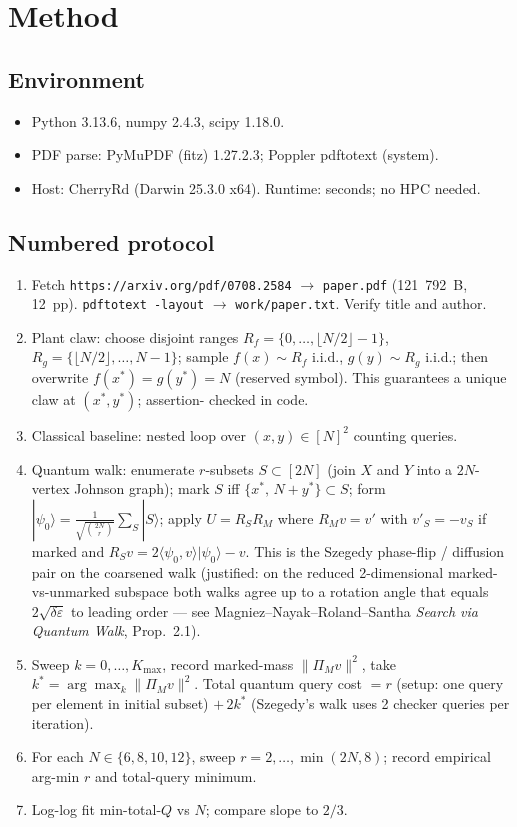 \documentclass[11pt]{article}
\begin{document}
\section{Method}
\subsection{Environment}
\begin{itemize}
\item Python 3.13.6, numpy 2.4.3, scipy 1.18.0.
\item PDF parse: PyMuPDF (fitz) 1.27.2.3; Poppler pdftotext (system).
\item Host: CherryRd (Darwin 25.3.0 x64). Runtime: seconds; no HPC needed.
\end{itemize}

\subsection{Numbered protocol}
\begin{enumerate}
\item Fetch \texttt{https://arxiv.org/pdf/0708.2584} $\rightarrow$
      \texttt{paper.pdf} (121~792~B, 12~pp). \texttt{pdftotext -layout}
      $\rightarrow$ \texttt{work/paper.txt}. Verify title and author.
\item Plant claw: choose disjoint ranges $R_f=\{0,\ldots,\lfloor N/2\rfloor-1\}$,
      $R_g=\{\lfloor N/2\rfloor,\ldots,N-1\}$; sample $f(x)\sim R_f$ i.i.d.,
      $g(y)\sim R_g$ i.i.d.; then overwrite $f(x^\ast)=g(y^\ast)=N$ (reserved
      symbol). This guarantees a unique claw at $(x^\ast,y^\ast)$; assertion-
      checked in code.
\item Classical baseline: nested loop over $(x,y)\in[N]^2$ counting queries.
\item Quantum walk: enumerate $r$-subsets $S\subset[2N]$ (join $X$ and $Y$ into
      a $2N$-vertex Johnson graph); mark $S$ iff $\{x^\ast,\,N+y^\ast\}\subset S$;
      form $|\psi_0\rangle=\frac{1}{\sqrt{\binom{2N}{r}}}\sum_S|S\rangle$;
      apply $U=R_S R_M$ where $R_M v = v'$ with $v'_S=-v_S$ if marked
      and $R_S v = 2\langle\psi_0,v\rangle|\psi_0\rangle - v$. This is the
      Szegedy phase-flip / diffusion pair on the coarsened walk (justified: on
      the reduced 2-dimensional marked-vs-unmarked subspace both walks agree
      up to a rotation angle that equals $2\sqrt{\delta\varepsilon}$ to
      leading order --- see Magniez--Nayak--Roland--Santha \emph{Search via
      Quantum Walk}, Prop.~2.1).
\item Sweep $k=0,\ldots,K_{\max}$, record marked-mass
      $\|\Pi_M v\|^2$, take $k^\ast=\arg\max_k \|\Pi_M v\|^2$. Total quantum
      query cost $=r$ (setup: one query per element in initial subset) $+\,2k^\ast$
      (Szegedy's walk uses 2 checker queries per iteration).
\item For each $N\in\{6,8,10,12\}$, sweep $r=2,\ldots,\min(2N,8)$; record
      empirical arg-min $r$ and total-query minimum.
\item Log-log fit min-total-$Q$ vs $N$; compare slope to $2/3$.
\end{enumerate}
\end{document}

